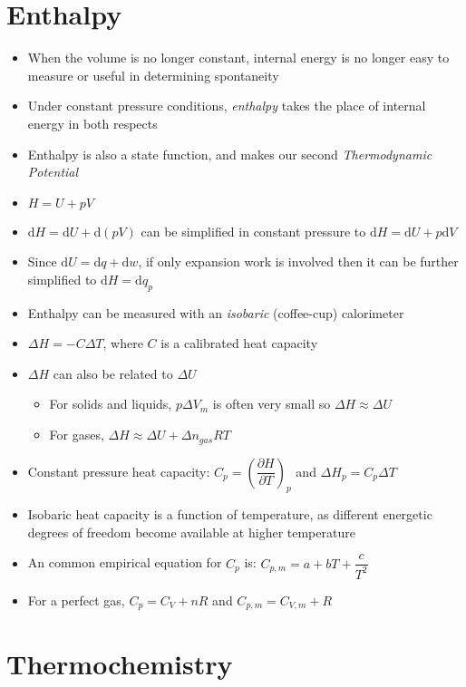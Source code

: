 \documentclass[12pt, openany, letterpaper]{memoir}
\begin{document}
\section{Enthalpy}
\begin{itemize}
	\item When the volume is no longer constant, internal energy is no longer easy to measure or useful in determining spontaneity
	\item Under constant pressure conditions, \emph{enthalpy} takes the place of internal energy in both respects
	\item Enthalpy is also a state function, and makes our second \emph{Thermodynamic Potential}
	\item $H = U + pV$
	\item $\mathrm{d}H = \mathrm{d}U + \mathrm{d}(pV)$ can be simplified in constant pressure to $\mathrm{d}H = \mathrm{d}U + p\mathrm{d}V$
	\item Since $\mathrm{d}U=\mathrm{d}q+\mathrm{d}w$, if only expansion work is involved then it can be further simplified to $\mathrm{d}H = \mathrm{d}q_p$
	\item Enthalpy can be measured with an \emph{isobaric} (coffee-cup) calorimeter
	\item $\Delta H = -C\Delta T$, where $C$ is a calibrated heat capacity
	\item $\Delta H$ can also be related to $\Delta U$
	      \begin{itemize}
		      \item For solids and liquids, $p\Delta V_m$ is often very small so $\Delta H \approx \Delta U$
		      \item For gases, $\Delta H \approx \Delta U + \Delta n_{gas}RT$
	      \end{itemize}
	\item Constant pressure heat capacity: $C_p = \left(\dfrac{\partial H}{\partial T}\right)_p$ and $\Delta H_p = C_p\Delta T$
	\item Isobaric heat capacity is a function of temperature, as different energetic degrees of freedom become available at higher temperature
	\item An common empirical equation for $C_p$ is: $C_{p,m} = a + bT + \dfrac{c}{T^2}$
	\item For a perfect gas, $C_p=C_V+nR$ and $C_{p,m}=C_{V,m}+R$
\end{itemize}

\section{Thermochemistry}
\end{document}
